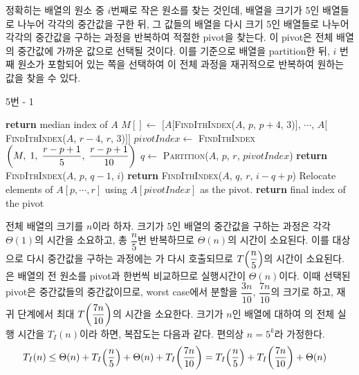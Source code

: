 \documentclass[10pt]{article}
\begin{document}
\vspace{3mm}
정확히는 배열의 원소 중 $i$번째로 작은 원소를 찾는 것인데, 배열을 크기가 5인 배열들로 나누어 각각의 중간값을 구한 뒤, 그 값들의 배열을 다시 크기 5인 배열들로 나누어 각각의 중간값을 구하는 과정을 반복하여 적절한 pivot을 찾는다.
이 pivot은 전체 배열의 중간값에 가까운 값으로 선택될 것이다. 이를 기준으로 배열을 partition한 뒤, $i$ 번째 원소가 포함되어 있는 쪽을 선택하여 이 전체 과정을 재귀적으로 반복하여 원하는 값을 찾을 수 있다.
\begin{algorithm}[H]
\caption{5번 - 1}\label{findmedian}
\begin{algorithmic}
     
            \State \textbf{return} median index of $A$
        \EndIf
        \State $M[] \gets$ $\Big[$$A\Big[$\textsc{FindIthIndex}($A$, $p$, $p+4$, $3$)$\Big]$, $\cdots$, $A\Big[$\textsc{FindIthIndex}($A$, $r-4$, $r$, $3$)$\Big]$$\Big]$
        \State $pivotIndex \gets$ \textsc{FindIthIndex}$\qty(M, \;1, \;\dfrac{r-p+1}{5}, \;\dfrac{r-p+1}{10})$
        \State $q \gets$ \textsc{Partition}($A$, $p$, $r$, $pivotIndex$)
            \State \textbf{return} \textsc{FindIthIndex}($A$, $p$, $q-1$, $i$)
        \Else
            \State \textbf{return} \textsc{FindIthIndex}($A$, $q$, $r$, $i-q+p$)
        \EndIf
    \EndProcedure
     
        \State Relocate elements of $A[p, \cdots, r]$ using $A[pivotIndex]$ as the pivot.
        \State \textbf{return} final index of the pivot
    \EndProcedure
\end{algorithmic}
\end{algorithm}
전체 배열의 크기를 $n$이라 하자.
크기가 5인 배열의 중간값을 구하는 과정은 각각 $\Theta(1)$의 시간을 소요하고, 총 $\dfrac{n}{5}$번 반복하므로 $\Theta(n)$의 시간이 소요된다.
이를 대상으로 다시 중간값을 구하는 과정에는 가 다시 호출되므로 $T\qty(\dfrac{n}{5})$의 시간이 소요된다.
은 배열의 전 원소를 pivot과 한번씩 비교하므로 실행시간이 $\Theta(n)$이다. 
이때 선택된 pivot은 중간값들의 중간값이므로, worst case에서 분할을 $\dfrac{3n}{10}$, $\dfrac{7n}{10}$의 크기로 하고, 재귀 단계에서 최대 $T\qty(\dfrac{7n}{10})$의 시간을 소요한다.
크기가 $n$인 배열에 대하여 의 전체 실행 시간을 $T_I(n)$이라 하면, 복잡도는 다음과 같다.
편의상 $n = 5^k$라 가정한다.
\begin{align*}
    T_I(n) &\leq \Theta(n) + T_I\qty(\frac{n}{5}) + \Theta(n) + T_I\qty(\frac{7n}{10}) = T_I\qty(\frac{n}{5}) + T_I\qty(\frac{7n}{10}) + \Theta(n)
\end{align*}
\end{document}
